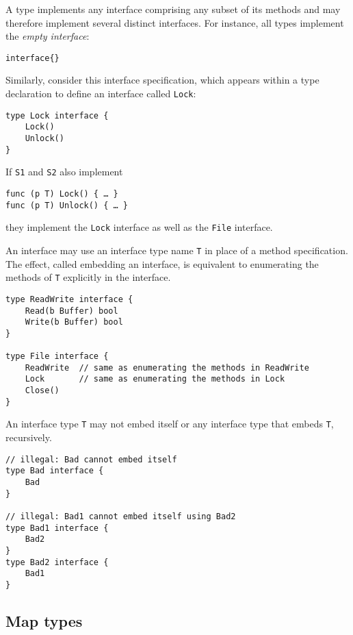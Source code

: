 {A type implements any interface comprising any subset of its methods and
may therefore implement several distinct interfaces. For instance, all
types implement the \emph{empty interface}:

\begin{Verbatim}[frame=single]
interface{}
\end{Verbatim}

Similarly, consider this interface specification, which appears within a
type declaration to define an interface
called \texttt{Lock}:

\begin{Verbatim}[frame=single]
type Lock interface {
    Lock()
    Unlock()
}
\end{Verbatim}

If \texttt{S1} and \texttt{S2} also implement

\begin{Verbatim}[frame=single]
func (p T) Lock() { … }
func (p T) Unlock() { … }
\end{Verbatim}

they implement the \texttt{Lock} interface as well as the \texttt{File}
interface.

An interface may use an interface type name \texttt{T} in place of a
method specification. The effect, called embedding an interface, is
equivalent to enumerating the methods of \texttt{T} explicitly in the
interface.

\begin{Verbatim}[frame=single]
type ReadWrite interface {
    Read(b Buffer) bool
    Write(b Buffer) bool
}

type File interface {
    ReadWrite  // same as enumerating the methods in ReadWrite
    Lock       // same as enumerating the methods in Lock
    Close()
}
\end{Verbatim}

An interface type \texttt{T} may not embed itself or any interface type
that embeds \texttt{T}, recursively.

\begin{Verbatim}[frame=single]
// illegal: Bad cannot embed itself
type Bad interface {
    Bad
}

// illegal: Bad1 cannot embed itself using Bad2
type Bad1 interface {
    Bad2
}
type Bad2 interface {
    Bad1
}
\end{Verbatim}

\subsection*{Map types}

}
